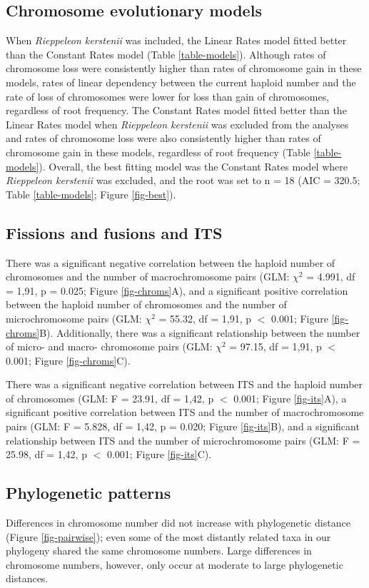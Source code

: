 \documentclass[a4paper, 12pt]{article}
\begin{document}
\subsection{Chromosome evolutionary models}
When \textit{Rieppeleon kerstenii} was included, the Linear Rates model fitted better than the Constant Rates model (Table \ref{table-models}).
Although rates of chromosome loss were consistently higher than rates of chromosome gain in these models, rates of linear dependency between the current haploid number and the rate of loss of chromosomes were lower for loss than gain of chromosomes, regardless of root frequency. 
The Constant Rates model fitted better than the Linear Rates model when \textit{Rieppeleon kerstenii} was excluded from the analyses and rates of chromosome loss were also consistently higher than rates of chromosome gain in these models, regardless of root frequency (Table \ref{table-models}). 
Overall, the best fitting model was the Constant Rates model where \textit{Rieppeleon kerstenii} was excluded, and the root was set to n = 18 (AIC = 320.5; Table \ref{table-models}; Figure \ref{fig-best}).

\subsection{Fissions and fusions and ITS}
There was a significant negative correlation between the haploid number of chromosomes and the number of macrochromosome pairs (GLM: $\chi^2$ = 4.991, df = 1,91, p = 0.025; Figure \ref{fig-chroms}A), and a significant positive correlation between the haploid number of chromosomes and the number of microchromosome pairs (GLM: $\chi^2$ = 55.32, df = 1,91, p $<$ 0.001; Figure \ref{fig-chroms}B). 
Additionally, there was a significant relationship between the number of micro- and macro- chromosome pairs (GLM: $\chi^2$ = 97.15, df = 1,91, p $<$ 0.001; Figure \ref{fig-chroms}C). 

There was a significant negative correlation between ITS and the haploid number of chromosomes (GLM: F = 23.91, df = 1,42, p $<$ 0.001; Figure \ref{fig-its}A), a significant positive correlation between ITS and the number of macrochromosome pairs (GLM: F = 5.828, df = 1,42, p = 0.020; Figure \ref{fig-its}B), and a significant relationship between ITS and the number of microchromosome pairs (GLM: F = 25.98, df = 1,42, p $<$ 0.001; Figure \ref{fig-its}C). 

\subsection{Phylogenetic patterns}
Differences in chromosome number did not increase with phylogenetic distance (Figure \ref{fig-pairwise}); even some of the most distantly related taxa in our phylogeny shared the same chromosome numbers. 
Large differences in chromosome numbers, however, only occur at moderate to large phylogenetic distances. 
\end{document}
